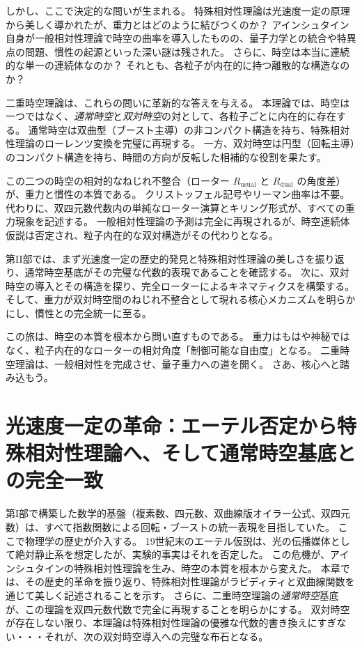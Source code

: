 \documentclass[dvipdfmx,a4paper]{jsbook}
\theoremstyle{definition}
\theoremstyle{remark}
\begin{document}
しかし、ここで決定的な問いが生まれる。
特殊相対性理論は光速度一定の原理から美しく導かれたが、重力とはどのように結びつくのか？
アインシュタイン自身が一般相対性理論で時空の曲率を導入したものの、量子力学との統合や特異点の問題、慣性の起源といった深い謎は残された。
さらに、時空は本当に連続的な単一の連続体なのか？
それとも、各粒子が内在的に持つ離散的な構造なのか？

二重時空理論は、これらの問いに革新的な答えを与える。
本理論では、時空は一つではなく、\emph{通常時空}と\emph{双対時空}の対として、各粒子ごとに内在的に存在する。
通常時空は双曲型（ブースト主導）の非コンパクト構造を持ち、特殊相対性理論のローレンツ変換を完璧に再現する。
一方、双対時空は円型（回転主導）のコンパクト構造を持ち、時間の方向が反転した相補的な役割を果たす。

この二つの時空の相対的なねじれ不整合（ローター $R_\text{usual}$ と $R_\text{dual}$ の角度差）が、重力と慣性の本質である。
クリストッフェル記号やリーマン曲率は不要。
代わりに、双四元数代数内の単純なローター演算とキリング形式が、すべての重力現象を記述する。
一般相対性理論の予測は完全に再現されるが、時空連続体仮説は否定され、粒子内在的な双対構造がその代わりとなる。

第II部では、まず光速度一定の歴史的発見と特殊相対性理論の美しさを振り返り、通常時空基底がその完璧な代数的表現であることを確認する。
次に、双対時空の導入とその構造を探り、完全ローターによるキネマティクスを構築する。
そして、重力が双対時空間のねじれ不整合として現れる核心メカニズムを明らかにし、慣性との完全統一に至る。

この旅は、時空の本質を根本から問い直すものである。
重力はもはや神秘ではなく、粒子内在的なローターの相対角度「制御可能な自由度」となる。
二重時空理論は、一般相対性を完成させ、量子重力への道を開く。
さあ、核心へと踏み込もう。

\chapter{光速度一定の革命：エーテル否定から特殊相対性理論へ、そして通常時空基底との完全一致}
\label{chap:light-speed-revolution}

第I部で構築した数学的基盤（複素数、四元数、双曲線版オイラー公式、双四元数）は、すべて指数関数による回転・ブーストの統一表現を目指していた。
ここで物理学の歴史が介入する。
19世紀末のエーテル仮説は、光の伝播媒体として絶対静止系を想定したが、実験的事実はそれを否定した。
この危機が、アインシュタインの特殊相対性理論を生み、時空の本質を根本から変えた。
本章では、その歴史的革命を振り返り、特殊相対性理論がラピディティと双曲線関数を通じて美しく記述されることを示す。
さらに、二重時空理論の\emph{通常時空}基底が、この理論を双四元数代数で完全に再現することを明らかにする。
双対時空が存在しない限り、本理論は特殊相対性理論の優雅な代数的書き換えにすぎない・・・それが、次の双対時空導入への完璧な布石となる。
\end{document}
